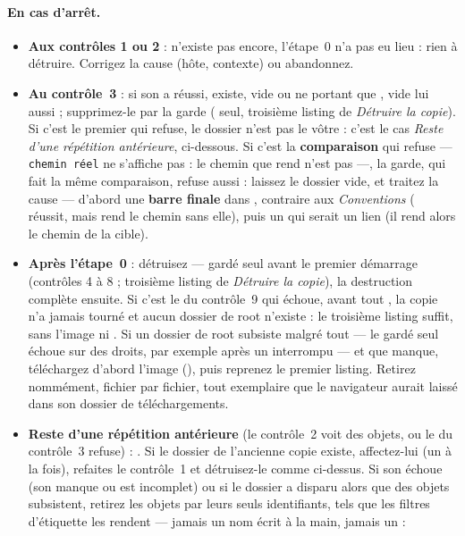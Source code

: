 \documentclass[a4paper,11pt,oneside]{article}
\begin{document}
\paragraph{En cas d'arrêt.}
\begin{itemize}
    \item \textbf{Aux contrôles 1 ou 2} :  n'existe pas encore, l'étape~0 n'a pas eu lieu : rien à détruire. Corrigez la cause (hôte, contexte) ou abandonnez.
    \item \textbf{Au contrôle~3} : si son  a réussi,  existe, vide ou ne portant que , vide lui aussi ; supprimez-le par la garde ( seul, troisième listing de \emph{Détruire la copie}). Si c'est le premier  qui refuse, le dossier n'est pas le vôtre : c'est le cas \emph{Reste d'une répétition antérieure}, ci-dessous. Si c'est la \textbf{comparaison} qui refuse --- \texttt{chemin réel} ne s'affiche pas : le chemin que rend  n'est pas  ---, la garde, qui fait la même comparaison, refuse aussi : laissez le dossier vide, et traitez la cause --- d'abord une \textbf{barre finale} dans , contraire aux \emph{Conventions} ( réussit, mais rend le chemin sans elle), puis un  qui serait un lien (il rend alors le chemin de la cible).
    \item \textbf{Après l'étape~0} : détruisez  ---  gardé seul avant le premier démarrage (contrôles 4 à 8 ; troisième listing de \emph{Détruire la copie}), la destruction complète ensuite. Si c'est le  du contrôle~9 qui échoue, avant tout , la copie n'a jamais tourné et aucun dossier de root n'existe : le troisième listing suffit, sans l'image  ni . Si un dossier de root subsiste malgré tout --- le  gardé seul échoue sur des droits, par exemple après un  interrompu --- et que  manque, téléchargez d'abord l'image (), puis reprenez le premier listing. Retirez nommément, fichier par fichier, tout exemplaire que le navigateur aurait laissé dans son dossier de téléchargements.
    \item \textbf{Reste d'une répétition antérieure} (le contrôle~2 voit des objets, ou le  du contrôle~3 refuse) : . Si le dossier de l'ancienne copie existe, affectez-lui  (un à la fois), refaites le contrôle~1 et détruisez-le comme ci-dessus. Si son  échoue (son  manque ou est incomplet) ou si le dossier a disparu alors que des objets subsistent, retirez les objets par leurs seuls identifiants, tels que les filtres d'étiquette les rendent --- jamais un nom écrit à la main, jamais un  :

\end{itemize}
\end{document}
